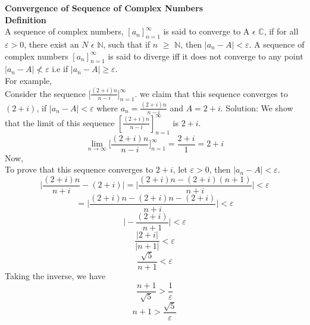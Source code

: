 \documentclass[a4paper, 12pt]{report}
\begin{document}
{\textbf{Convergence of Sequence of Complex Numbers}\\
\textbf{Definition}\\
A sequence of complex numbers, $[a_n]^\infty_{n=1}$ is said to converge to A $\epsilon$ $\mathbb{C}$, if for all $\varepsilon > 0$, there exist an $N$ $\epsilon$ $\mathbb{N}$, such that if $n$ $\geq$ $\mathbb{N}$, then $|a_n - A| < \varepsilon$.
A sequence of complex numbers $[a_n]^\infty_{n=1}$ is said to diverge iff it does not converge to any point $|a_n - A| \nless \varepsilon$ i.e if $|a_n - A| \geq \varepsilon$.\\
For example,\\
Consider the sequence $\bigg[\frac{(2 + i)n}{n - i}\bigg]^\infty_{n=1}$. we claim that this sequence converges to $(2 + i)$, if $|a_n - A| < \varepsilon$ where $a_n = \frac{(2 + i)n}{n - i}$ and $A = 2 + i$.
Solution:
We show that the limit of this sequence $[\frac{(2 + i)n}{n - i}]^\infty_{n=1}$ is $2 + i$.
\begin{equation*}
\lim_{n\rightarrow\infty}\bigg[\frac{(2 + i)n}{n - i}\bigg]^\infty_{n=1} = \frac{2 + i}{1} = 2 + i
\end{equation*}
Now,\\
To prove that this sequence converges to $2 + i$, let $\varepsilon > 0$, then $|a_n - A| < \varepsilon$.
\begin{equation*}
\bigg|\frac{(2 + i)n}{n + i} - (2 + i)\bigg| = \bigg|\frac{(2 + i)n - (2 + i)(n + 1)}{n + i}\bigg| < \varepsilon
\end{equation*}
\begin{equation*}
= \bigg|\frac{(2 + i)n - (2 + i)n  - (2 + i)}{n + i}\bigg|  < \varepsilon
\end{equation*}
\begin{equation*}
\bigg|-\frac{(2 + i)}{n + 1}\bigg| < \varepsilon
\end{equation*}
\begin{equation*}
\frac{|2 + i|}{|n + 1|} < \varepsilon
\end{equation*}
\begin{equation*}
\frac{\sqrt{5}}{n + 1} < \varepsilon
\end{equation*}
Taking the inverse, we have 
\begin{equation*}
\frac{n + 1}{\sqrt{5}} >  \frac{1}{\varepsilon}
\end{equation*}
\begin{equation*}
n + 1 > \frac{\sqrt{5}}{\varepsilon}
\end{equation*}
\begin{equation*}

\end{equation*}}
\end{document}
